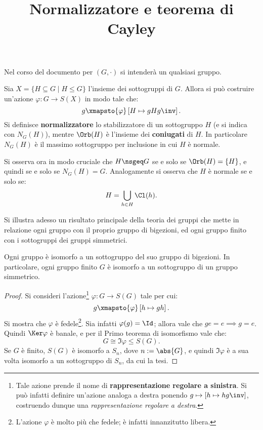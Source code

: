 \documentclass[12pt]{scrartcl}
\begin{document}
	\title{Normalizzatore e teorema di Cayley}
	\maketitle
	
	\begin{note}
		Nel corso del documento per $(G, \cdot)$ si intenderà un qualsiasi gruppo.
	\end{note}
	
	Sia $X = \{ H \subseteq G \mid H \leq G \}$ l'insieme dei sottogruppi di $G$.
	Allora si può costruire un'azione $\varphi : G \to S(X)$ in modo tale che:
	\[ g \xmapsto{\varphi} \left[ H \mapsto gHg\inv \right]. \]
	Si definisce \textbf{normalizzatore} lo stabilizzatore di un sottogruppo
	$H$ (e si indica con $N_G(H)$), mentre $\Orb(H)$ è l'insieme dei \textbf{coniugati}
	di $H$. In particolare $N_G(H)$ è il massimo sottogruppo per inclusione in cui $H$
	è normale. \medskip
	
	
	Si osserva ora in modo cruciale che $H \nsgeq G$ se e solo se
	$\Orb(H) = \{H\}$, e quindi se e solo se $N_G(H) = G$. Analogamente si
	osserva che $H$ è normale se e solo se:
	\[ H = \bigcup_{h \in H} \Cl(h). \] \bigskip
	
	
	Si illustra adesso un risultato principale della teoria dei gruppi che mette in
	relazione ogni gruppo con il proprio gruppo di bigezioni, ed ogni gruppo finito con i
	sottogruppi dei gruppi simmetrici.
	
	\begin{theorem}[di Cayley]
		Ogni gruppo è isomorfo a un sottogruppo del suo gruppo di bigezioni.
		In particolare, ogni gruppo finito $G$ è isomorfo a un sottogruppo di un gruppo
		simmetrico.
	\end{theorem}
	
	\begin{proof}
		Si consideri l'azione\footnote{Tale azione prende il nome di \textbf{rappresentazione regolare a sinistra}.
		Si può infatti definire un'azione analoga a destra ponendo $g \mapsto \left[ h \mapsto hg\inv \right]$,
		costruendo dunque una \textit{rappresentazione regolare a destra}.} $\varphi : G \to S(G)$ tale per cui:
		\[ g \xmapsto{\varphi} \left[ h \mapsto gh \right]. \]
		Si mostra che $\varphi$ è fedele\footnote{L'azione $\varphi$ è molto
		più che fedele; è infatti innanzitutto libera.}. Sia infatti $\varphi(g) = \Id$; allora
		vale che $ge = e \implies g = e$. Quindi $\Ker \varphi$ è banale, e per il
		Primo teorema di isomorfismo vale che:
		\[ G \cong \Im \varphi \leq S(G). \]
		Se $G$ è finito, $S(G)$ è isomorfo a $S_n$, dove $n := \abs{G}$, e quindi
		$\Im \varphi$ è a sua volta isomorfo a un sottogruppo di $S_n$, da cui
		la tesi.
	\end{proof}
	
\end{document}
